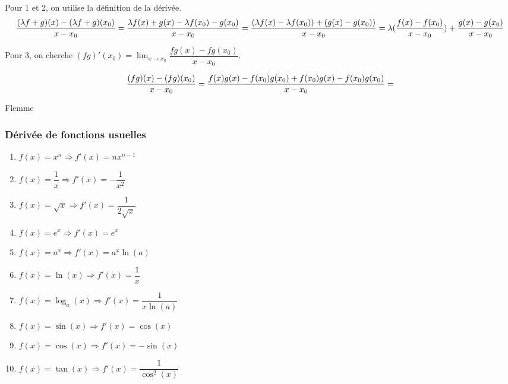 \documentclass[a4paper, 12pt]{article}
\begin{document}
\begin{demonstration}
    Pour 1 et 2, on utilise la définition de la dérivée.
    $$
    \dfrac{(\lambda f + g)(x) - (\lambda f + g)(x_0)}{x - x_0} \\
    = \dfrac{\lambda f(x) + g(x) - \lambda f(x_0) - g(x_0)}{x - x_0} \\
    = \dfrac{(\lambda f(x) - \lambda f(x_0)) + (g(x) - g(x_0))}{x - x_0} \\
    = \lambda (\dfrac{f(x) - f(x_0)}{x - x_0}) + \dfrac{g(x) - g(x_0)}{x - x_0}
    $$
    
    Pour 3, on cherche
    $(fg)'(x_0) = \lim_{x \to x_0}\dfrac{fg(x) - fg(x_0)}{x - x_0}$.
    
    $$
    \dfrac{(fg)(x) - (fg)(x_0)}{x - x_0} = \dfrac{f(x)g(x) - f(x_0)g(x_0) + f(x_0)g(x) - f(x_0)g(x_0)}{x - x_0} \\
    = %
    $$
    
    Flemme
\end{demonstration}

\subsubsection{Dérivée de fonctions usuelles}

\begin{methode}
    \begin{enumerate}
        \item $f(x) = x^n \Rightarrow f'(x) = nx^{n-1}$
        \item $f(x) = \dfrac{1}{x} \Rightarrow f'(x) = -\dfrac{1}{x^2}$
        \item $f(x) = \sqrt{x} \Rightarrow f'(x) = \dfrac{1}{2\sqrt{x}}$
        \item $f(x) = e^x \Rightarrow f'(x) = e^x$
        \item $f(x) = a^x \Rightarrow f'(x) = a^x\ln(a)$
        \item $f(x) = \ln(x) \Rightarrow f'(x) = \dfrac{1}{x}$
        \item $f(x) = \log_a(x) \Rightarrow f'(x) = \dfrac{1}{x\ln(a)}$
        \item $f(x) = \sin(x) \Rightarrow f'(x) = \cos(x)$
        \item $f(x) = \cos(x) \Rightarrow f'(x) = -\sin(x)$
        \item $f(x) = \tan(x) \Rightarrow f'(x) = \dfrac{1}{\cos^2(x)}$
    \end{enumerate}
\end{methode}
\end{document}
